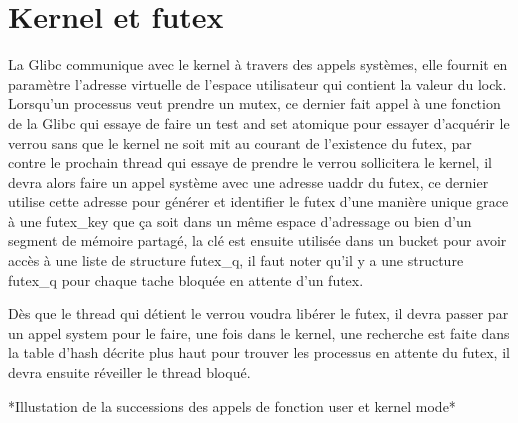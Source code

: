 \section*{Kernel et futex}
La Glibc communique avec le kernel à travers des appels systèmes, elle fournit 
en paramètre l'adresse virtuelle de l'espace utilisateur qui contient la valeur 
du lock.
\\
Lorsqu'un processus veut prendre un mutex, ce dernier fait appel à une fonction 
de la Glibc qui essaye de faire un test and set atomique pour essayer d'acquérir
le verrou sans que le kernel ne soit mit au courant de l'existence du futex, 
par contre le prochain thread qui essaye de 
prendre le verrou sollicitera le kernel, il devra alors faire un appel 
système avec une adresse uaddr du futex, ce dernier utilise cette adresse pour 
générer et identifier le futex d'une manière unique grace à une futex\_key que 
ça soit dans un même espace d'adressage ou bien d'un segment de mémoire 
partagé, la clé est ensuite utilisée dans un bucket pour avoir accès à une 
liste de structure futex\_q, il faut noter qu'il y a une structure futex\_q pour 
chaque tache bloquée en attente d'un futex.

Dès que le thread qui détient le verrou voudra libérer le futex, il devra passer
par un appel system pour le faire, une fois dans le kernel, une
recherche est faite dans la table d'hash décrite plus haut pour trouver les 
processus en attente du futex, il devra ensuite réveiller le thread bloqué.



*Illustation de la successions des appels de fonction user et kernel mode*